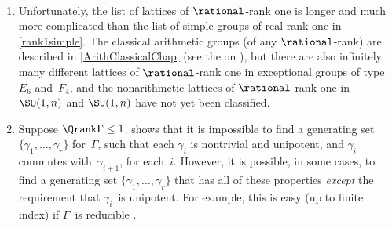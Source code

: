 \begin{rems} \ 
\noprelistbreak
 \begin{enumerate}

\item Unfortunately, the list of lattices of $\rational$-rank one is longer and much more complicated than the list of simple groups of real rank one in \cref{rank1simple}. The classical arithmetic groups (of any $\rational$-rank) are described in \cref{ArithClassicalChap} (see the  on \pageref{IrredInG}), but there are also infinitely many different lattices of $\rational$-rank one in exceptional groups of type $E_6$ and~$F_4$, and the nonarithmetic lattices of $\rational$-rank one in $\SO(1,n)$ and $\SU(1,n)$ have not yet been classified.

 \item Suppose $\Qrank \Gamma \le 1$.
 shows that it is impossible to
find a generating set $\{\gamma_1,\ldots,\gamma_r\}$
for~$\Gamma$, such that each $\gamma_i$ is nontrivial and
unipotent, and $\gamma_i$ commutes with~$\gamma_{i+1}$, for
each~$i$. However, it is possible, in some cases, to find a
generating set $\{\gamma_1,\ldots,\gamma_r\}$ that has all
of these properties \emph{except} the requirement that
$\gamma_i$~is unipotent. For example, this is easy (up to
finite index) if $\Gamma$~is reducible .

 \end{enumerate}
 \end{rems}
 

